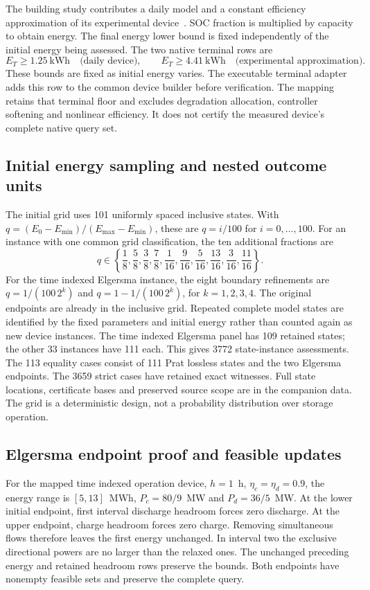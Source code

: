 The building study contributes a daily model and a constant efficiency
approximation of its experimental device~\cite{tziovani2025energy}.
SOC fraction is multiplied by capacity to obtain energy. The final energy
lower bound is fixed independently of the initial energy being assessed.
The two native terminal rows are
\begin{equation}
E_T\geq 1.25~\mathrm{kWh}\quad\text{(daily device)},\qquad
E_T\geq 4.41~\mathrm{kWh}\quad\text{(experimental approximation)}.
\label{eq:terminal_floors}
\end{equation}
These bounds are fixed as initial energy varies. The executable terminal
adapter adds this row to the common device builder before verification.
The mapping retains that terminal floor and excludes degradation allocation,
controller softening and nonlinear efficiency. It does not certify the
measured device's complete native query set.

\subsection{Initial energy sampling and nested outcome units}
The initial grid uses 101 uniformly spaced inclusive states. With
$q=(E_0-E_{\min})/(E_{\max}-E_{\min})$, these are $q=i/100$ for
$i=0,\ldots,100$. For an instance with one common grid classification,
the ten additional fractions are
\begin{equation}
q\in\left\{\frac18,\frac58,\frac38,\frac78,\frac1{16},\frac9{16},
\frac5{16},\frac{13}{16},\frac3{16},\frac{11}{16}\right\}.
\label{eq:external_extra_states}
\end{equation}
For the time indexed Elgersma instance, the eight boundary refinements are
$q=1/(100\,2^k)$ and $q=1-1/(100\,2^k)$, for $k=1,2,3,4$.
The original endpoints are already in the inclusive grid. Repeated complete
model states are identified by the fixed parameters and initial energy
rather than counted again as new device instances.
The time indexed Elgersma panel has 109 retained states; the other 33
instances have 111 each. This gives 3772 state-instance assessments.
The 113 equality cases consist of 111 Prat lossless states and the two
Elgersma endpoints. The 3659 strict cases have retained exact witnesses.
Full state locations, certificate bases and preserved source scope are in
the companion data. The grid is a deterministic design, not a probability
distribution over storage operation.

\subsection{Elgersma endpoint proof and feasible updates}
For the mapped time indexed operation device, $h=1$~h,
$\eta_c=\eta_d=0.9$, the energy range is $[5,13]$~MWh,
$P_c=80/9$~MW and $P_d=36/5$~MW. At the lower initial endpoint,
first interval discharge headroom forces zero discharge. At the upper
endpoint, charge headroom forces zero charge. Removing simultaneous flows
therefore leaves the first energy unchanged. In interval two the exclusive
directional powers are no larger than the relaxed ones. The unchanged
preceding energy and retained headroom rows preserve the bounds. Both
endpoints have nonempty feasible sets and preserve the complete query.

